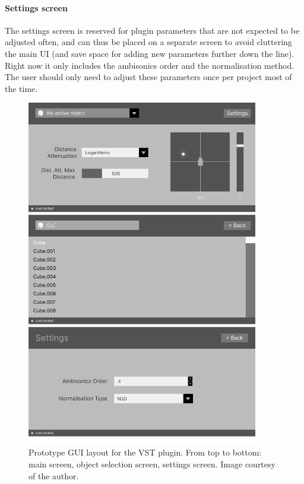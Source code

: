 \paragraph*{Settings screen}
The settings screen is reserved for plugin parameters that are not expected to be adjusted often,
and can thus be placed on a separate screen to avoid cluttering the main UI (and save space for adding new parameters further down the line).
Right now it only includes the ambisonics order and the normalisation method.
The user should only need to adjust these parameters once per project most of the time.

\begin{figure}    
    \includegraphics[width=0.9\textwidth]{images/implementation/gui_wireframe_whitespace_bottom.png}
    \centering
    \caption{Prototype GUI layout for the VST plugin. From top to bottom: main screen, object selection screen, settings screen.
             Image courtesy of the author. \label{fig:gui_prototype}}
\end{figure}

